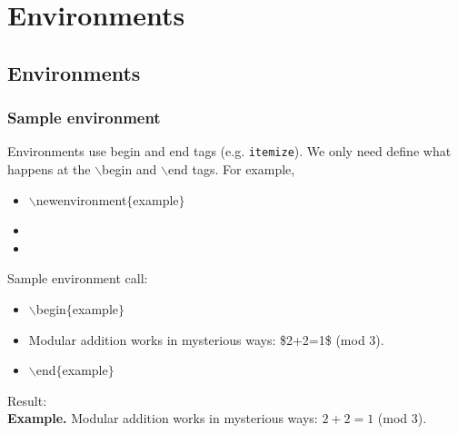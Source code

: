 \section[Environments]{Environments}
\subsection[Environments]{Environments}

\begin{frame}  \frametitle{Sample environment}
	Environments use begin and end tags (e.g. \texttt{itemize}). We only need define what happens at the {\color{command}$\backslash$begin} and {\color{command}$\backslash$end} tags. For example,
	\begin{itemize}
		\item[] {\color{command}$\backslash$newenvironment\color{braces}$\{${\color{black}example}$\}$}
		\item[] 
		\item[] 
	\end{itemize}
	Sample environment call:
	\begin{itemize}
		\item[] {\color{command}$\backslash$begin\color{braces}$\{${\color{black}example}$\}$}
		\item[] Modular addition works in mysterious ways: {\color{braces}\$}2+2=1{\color{braces}\$} (mod 3).
		\item[] {\color{command}$\backslash$end\color{braces}$\{${\color{black}example}$\}$}
	\end{itemize}
	Result:
	\vspace{5mm} \\
	\small\textbf{Example.}\hspace{1.5mm} Modular addition works in mysterious ways: $2+2 = 1$ (mod 3).
\end{frame}

